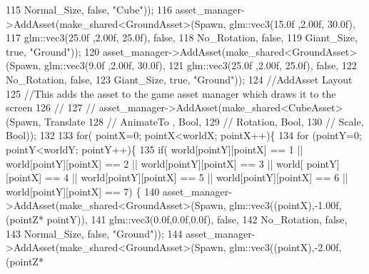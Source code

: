 \begin{DoxyCode}
115                                                          Normal\_Size, \textcolor{keyword}{false}, \textcolor{stringliteral}{"Cube"})); 
116         asset\_manager->AddAsset(make\_shared<GroundAsset>(Spawn, glm::vec3(15.0f ,2.00f, 30.0f),
117                                                          glm::vec3(25.0f ,2.00f, 25.0f), \textcolor{keyword}{false},
118                                                          No\_Rotation, \textcolor{keyword}{false},
119                                                          Giant\_Size, \textcolor{keyword}{true}, \textcolor{stringliteral}{"Ground"}));
120         asset\_manager->AddAsset(make\_shared<GroundAsset>(Spawn, glm::vec3(9.0f ,2.00f, 30.0f),
121                                                          glm::vec3(25.0f ,2.00f, 25.0f), \textcolor{keyword}{false},
122                                                          No\_Rotation, \textcolor{keyword}{false},
123                                                          Giant\_Size, \textcolor{keyword}{true}, \textcolor{stringliteral}{"Ground"}));
124    \textcolor{comment}{//AddAsset Layout }
125    \textcolor{comment}{//This adds the asset to the game asset manager which draws it to the screen}
126    \textcolor{comment}{//}
127    \textcolor{comment}{//  asset\_manager->AddAsset(make\_shared<CubeAsset>(Spawn, Translate}
128    \textcolor{comment}{//                                                 AnimateTo , Bool,}
129    \textcolor{comment}{//                                                 Rotation, Bool,}
130    \textcolor{comment}{//                                                 Scale, Bool));  }
132 \textcolor{comment}{}
133   \textcolor{keywordflow}{for}( pointX=0; pointX<worldX; pointX++)\{
134    \textcolor{keywordflow}{for} (pointY=0; pointY<worldY; pointY++)\{
135     \textcolor{keywordflow}{if}( world[pointY][pointX] == 1 || world[pointY][pointX] == 2 || world[pointY][pointX] == 3 || world[
      pointY][pointX] == 4 || world[pointY][pointX] == 5 || world[pointY][pointX] == 6 || world[pointY][pointX] == 7)
      \{          
140             asset\_manager->AddAsset(make\_shared<GroundAsset>(Spawn, glm::vec3((pointX),-1.00f,(pointZ*
      pointY)),
141                                                              glm::vec3(0.0f,0.0f,0.0f), \textcolor{keyword}{false},
142                                                              No\_Rotation, \textcolor{keyword}{false},
143                                                              Normal\_Size, \textcolor{keyword}{false}, \textcolor{stringliteral}{"Ground"}));
144             asset\_manager->AddAsset(make\_shared<GroundAsset>(Spawn, glm::vec3((pointX),-2.00f,(pointZ*

\end{DoxyCode}
